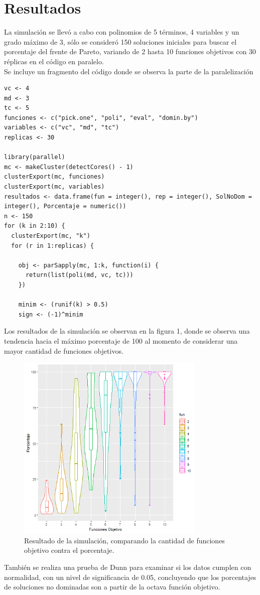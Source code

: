 \documentclass{article}
\begin{document}
\section{Resultados}
La simulación se llevó a cabo con polinomios de 5 términos, 4 variables y un grado máximo de 3, sólo se consideró 150 soluciones iniciales para buscar el porcentaje del frente de Pareto, variando de 2 hasta 10 funciones objetivos con 30 réplicas en el código en paralelo\cite{REF2}.\\
Se incluye un fragmento del código donde se observa la parte de la paralelización
\begin{lstlisting}[frame=single]
vc <- 4
md <- 3
tc <- 5
funciones <- c("pick.one", "poli", "eval", "domin.by")
variables <- c("vc", "md", "tc")
replicas <- 30

library(parallel)
mc <- makeCluster(detectCores() - 1)
clusterExport(mc, funciones)
clusterExport(mc, variables)
resultados <- data.frame(fun = integer(), rep = integer(), SolNoDom = integer(), Porcentaje = numeric())
n <- 150
for (k in 2:10) {
  clusterExport(mc, "k")
  for (r in 1:replicas) {
    
    obj <- parSapply(mc, 1:k, function(i) {
      return(list(poli(md, vc, tc)))
    })
    
    minim <- (runif(k) > 0.5)
    sign <- (-1)^minim

\end{lstlisting}
Los resultados de la simulación se observan en la figura 1, donde se observa una tendencia hacia el máximo porcentaje de 100 al momento de considerar una mayor cantidad de funciones objetivos.
\begin{figure}[H]
\centering
\includegraphics[width=9cm]{2.png}
\caption{Resultado de la simulación, comparando la cantidad de funciones objetivo contra el porcentaje.}
\end{figure}
También se realiza una prueba de Dunn para examinar si los datos cumplen con normalidad, con un nivel de significancia de 0.05, concluyendo que los porcentajes de soluciones no dominadas son a partir de la octava función objetivo.
\end{document}
